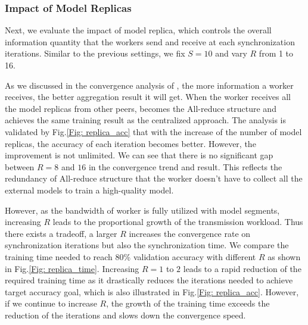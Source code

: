 \subsubsection{Impact of Model Replicas}

Next, we evaluate the impact of model replica, which controls the overall information quantity that the workers send and receive at each synchronization iterations. Similar to the previous settings, we fix $S=10$ and vary $R$ from 1 to 16.

As we discussed in the convergence analysis of \sys, the more information a worker receives, the better aggregation result it will get. When the worker receives all the model replicas from other peers, \sys becomes the All-reduce structure and achieves the same training result as the centralized approach. The analysis is validated by Fig.\ref{Fig: replica_acc} that with the increase of the number of model replicas, the accuracy of each iteration becomes better. However, the improvement is not unlimited. We can see that there is no significant gap between $R=8$ and $16$ in the convergence trend and result. This reflects the redundancy of All-reduce structure that the worker doesn't have to collect all the external models to train a high-quality model.

However, as the bandwidth of worker is fully utilized with model segments, increasing $R$ leads to the proportional growth of the transmission workload. Thus there exists a tradeoff, a larger $R$ increases the convergence rate on synchronization iterations but also the synchronization time. We compare the training time needed to reach 80\% validation accuracy with different $R$ as shown in Fig.\ref{Fig: replica_time}. Increasing $R=1$ to $2$ leads to a rapid reduction of the required training time as it drastically reduces the iterations needed to achieve target accuracy goal, which is also illustrated in Fig.\ref{Fig: replica_acc}. However, if we continue to increase $R$, the growth of the training time exceeds the reduction of the iterations and slows down the convergence speed.













